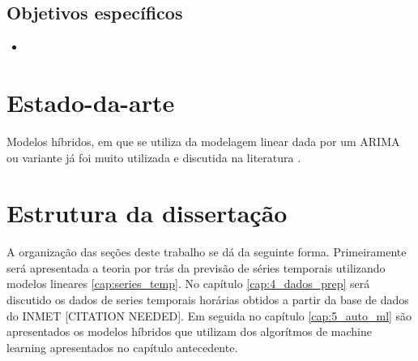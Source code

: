 \subsection{Objetivos específicos}

\begin{itemize}
    \item 
\end{itemize}

\section{Estado-da-arte}

Modelos híbridos, em que se utiliza da modelagem linear dada por um ARIMA ou variante já foi muito utilizada e discutida na literatura \cite{zhang2003time, khashei2010artificial, babu2014moving, de2014hybrid, de2016hybrid, domingos2019intelligent}.

\section{Estrutura da dissertação}

A organização das seções deste trabalho se dá da seguinte forma. Primeiramente será apresentada a teoria por trás da previsão de séries temporais utilizando modelos lineares \ref{cap:series_temp}. %
No capítulo \ref{cap:4_dados_prep} será discutido os dados de series temporais horárias obtidos a partir da base de dados do INMET [CITATION NEEDED]. Em seguida no capítulo \ref{cap:5_auto_ml} são apresentados os modelos híbridos que utilizam dos algorítmos de machine learning apresentados no capítulo antecedente.